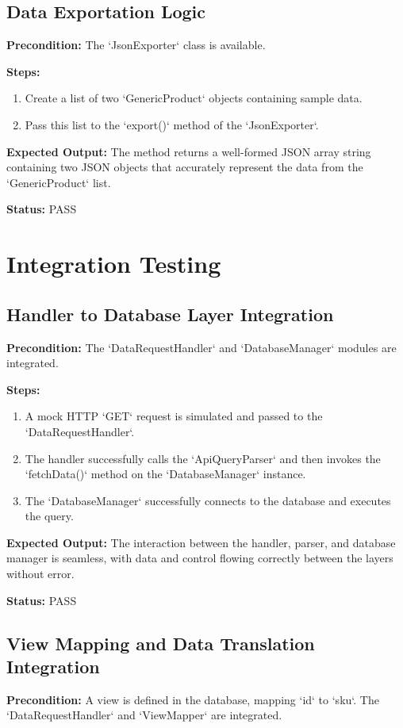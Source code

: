 \documentclass[12pt, a4paper]{report}
\begin{document}
\subsection{Data Exportation Logic}
\textbf{Precondition:} The `JsonExporter` class is available.

\textbf{Steps:}
\begin{enumerate}
    \item Create a list of two `GenericProduct` objects containing sample data.
    \item Pass this list to the `export()` method of the `JsonExporter`.
\end{enumerate}

\textbf{Expected Output:} The method returns a well-formed JSON array string containing two JSON objects that accurately represent the data from the `GenericProduct` list.

\textbf{Status:} PASS

\section{Integration Testing}
\subsection{Handler to Database Layer Integration}
\textbf{Precondition:} The `DataRequestHandler` and `DatabaseManager` modules are integrated.

\textbf{Steps:}
\begin{enumerate}
    \item A mock HTTP `GET` request is simulated and passed to the `DataRequestHandler`.
    \item The handler successfully calls the `ApiQueryParser` and then invokes the `fetchData()` method on the `DatabaseManager` instance.
    \item The `DatabaseManager` successfully connects to the database and executes the query.
\end{enumerate}

\textbf{Expected Output:} The interaction between the handler, parser, and database manager is seamless, with data and control flowing correctly between the layers without error.

\textbf{Status:} PASS

\subsection{View Mapping and Data Translation Integration}
\textbf{Precondition:} A view is defined in the database, mapping `id` to `sku`. The `DataRequestHandler` and `ViewMapper` are integrated.
\end{document}
